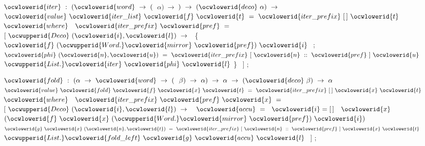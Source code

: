 \documentclass[12pt]{article}
\begin{document}
\ocwendcode{}\ocwindent{0.00em}
\ocwbegindcode{}$\ocwlowerid{iter}~:~(\ocwlowerid{word}~\rightarrow{}~($~$\alpha{})~\rightarrow{}~$$)~\rightarrow{}~(\ocwlowerid{deco}~\alpha{})~\rightarrow{}~$\ocwenddcode{} 
\ocweol
\label{../ML/deco.ml:4185}%
\medskip
\ocwbegincode{}\ocwindent{0.00em}
$\ocwlowerid{value}~\ocwlowerid{iter\_list}~\ocwlowerid{f}~\ocwlowerid{t}~=~\ocwlowerid{iter\_prefix}~[\,]~\ocwlowerid{t}$\ocweol
\ocwindent{1.00em}
$\ocwlowerid{where}~$~$\ocwlowerid{iter\_prefix}~\ocwlowerid{pref}~=~$\ocweol
\ocwindent{2.00em}
$[~\ocwupperid{Deco}~(\ocwlowerid{i},\ocwlowerid{l})~\rightarrow{}~$\ocweol
\ocwindent{3.50em}
\{~$\ocwlowerid{f}~(\ocwupperid{Word.}\ocwlowerid{mirror}~\ocwlowerid{pref})~\ocwlowerid{i}~$\ocweol
\ocwindent{3.50em}
;~~$\ocwlowerid{phi}~(\ocwlowerid{n},\ocwlowerid{u})~=~\ocwlowerid{iter\_prefix}~[~\ocwlowerid{n}~::~\ocwlowerid{pref}~]~\ocwlowerid{u}~$\ocweol
\ocwindent{4.50em}
$\ocwupperid{List.}\ocwlowerid{iter}~\ocwlowerid{phi}~\ocwlowerid{l}$\ocweol
\ocwindent{3.50em}
\}~\ocweol
\ocwindent{2.00em}
$]$\ocweol
\ocwindent{0.00em}
;\medskip

\ocwendcode{}\ocwindent{0.00em}
\ocwbegindcode{}$\ocwlowerid{fold}~:~(\alpha{}~\rightarrow{}~\ocwlowerid{word}~\rightarrow{}~($~$\beta{})~\rightarrow{}~\alpha{})~\rightarrow{}~\alpha{}~\rightarrow{}~(\ocwlowerid{deco}~\beta{})~\rightarrow{}~\alpha{}$\ocwenddcode{} 
\ocweol
\label{../ML/deco.ml:4487}%
\medskip
\ocwbegincode{}\ocwindent{0.00em}
$\ocwlowerid{value}~\ocwlowerid{fold}~\ocwlowerid{f}~\ocwlowerid{x}~\ocwlowerid{t}~=~\ocwlowerid{iter\_prefix}~[\,]~\ocwlowerid{x}~\ocwlowerid{t}$\ocweol
\ocwindent{1.00em}
$\ocwlowerid{where}~$~$\ocwlowerid{iter\_prefix}~\ocwlowerid{pref}~\ocwlowerid{x}~=~$\ocweol
\ocwindent{2.00em}
$[~\ocwupperid{Deco}~(\ocwlowerid{i},\ocwlowerid{l})~\rightarrow{}$\ocweol
\ocwindent{3.00em}
~$\ocwlowerid{accu}~=~$~$\ocwlowerid{i}=[\,]~$~$\ocwlowerid{x}~$~$(\ocwlowerid{f}~\ocwlowerid{x}~(\ocwupperid{Word.}\ocwlowerid{mirror}~\ocwlowerid{pref})~\ocwlowerid{i})$\ocweol
\ocwindent{3.00em}
~$\ocwlowerid{g}~\ocwlowerid{x}~(\ocwlowerid{n},\ocwlowerid{t})~=~\ocwlowerid{iter\_prefix}~[~\ocwlowerid{n}~::~\ocwlowerid{pref}~]~\ocwlowerid{x}~\ocwlowerid{t}~$\ocweol
\ocwindent{3.00em}
$\ocwupperid{List.}\ocwlowerid{fold\_left}~\ocwlowerid{g}~\ocwlowerid{accu}~\ocwlowerid{l}~$\ocweol
\ocwindent{2.00em}
$]$\ocweol
\ocwindent{0.00em}
;\medskip
\end{document}
